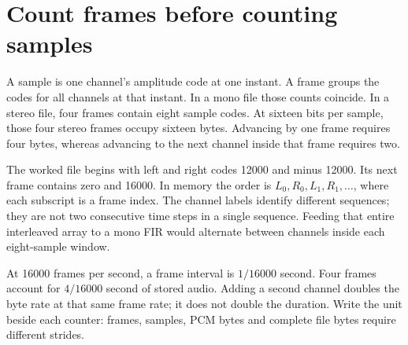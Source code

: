 \section{Count frames before counting samples}
A sample is one channel's amplitude code at one instant. A frame groups the codes for
all channels at that instant. In a mono file those counts coincide. In a stereo file,
four frames contain eight sample codes. At sixteen bits per sample, those four stereo
frames occupy sixteen bytes. Advancing by one frame requires four bytes, whereas
advancing to the next channel inside that frame requires two.

The worked file begins with left and right codes 12000 and minus 12000. Its next frame
contains zero and 16000. In memory the order is $L_0,R_0,L_1,R_1,\ldots$, where each
subscript is a frame index. The channel labels identify different sequences; they are
not two consecutive time steps in a single sequence. Feeding that entire interleaved
array to a mono FIR would alternate between channels inside each eight-sample window.

At 16000 frames per second, a frame interval is $1/16000$ second. Four frames account
for $4/16000$ second of stored audio. Adding a second channel doubles the byte rate at
that same frame rate; it does not double the duration. Write the unit beside each
counter: frames, samples, PCM bytes and complete file bytes require different strides.

